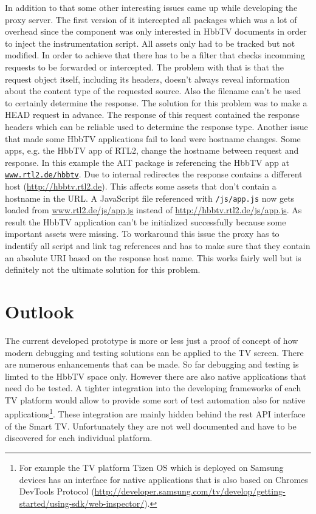 In addition to that some other interesting issues came up while developing the proxy server. The first version of it
intercepted all packages which was a lot of overhead since the component was only interested in HbbTV documents in
order to inject the instrumentation script. All assets only had to be tracked but not modified. In order to achieve
that there has to be a filter that checks incomming requests to be forwarded or intercepted. The problem with that is
that the request object itself, including its headers, doesn't always reveal information about the content type of the
requested source. Also the filename can't be used to certainly determine the response. The solution for this problem
was to make a HEAD request in advance. The response of this request contained the response headers which can be
reliable used to determine the response type. Another issue that made some HbbTV applications fail to load were
hostname changes. Some apps, e.g. the HbbTV app of RTL2, change the hostname between request and response. In this
example the AIT package is referencing the HbbTV app at \texttt{\url{www.rtl2.de/hbbtv}}. Due to internal redirectes
the response contains a different host (\url{http://hbbtv.rtl2.de}). This affects some assets that don't contain a
hostname in the URL. A JavaScript file referenced with \texttt{/js/app.js} now gets loaded from \url{www.rtl2.de/js/app.js}
instead of \url{http://hbbtv.rtl2.de/js/app.js}. As result the HbbTV application can't be initialized successfully
because some important assets were missing. To workaround this issue the proxy has to indentify all script and link tag
references and has to make sure that they contain an absolute URI based on the response host name. This works fairly
well but is definitely not the ultimate solution for this problem.

\section{Outlook\label{sec:outlook}}


The current developed prototype is more or less just a proof of concept of how modern debugging and testing solutions
can be applied to the TV screen. There are numerous enhancements that can be made. So far debugging and testing is
limted to the HbbTV space only. However there are also native applications that need do be tested. A tighter integration
into the developing frameworks of each TV platform would allow to provide some sort of test automation also for native
applications\footnote{For example the TV platform Tizen OS which is deployed on Samsung devices has an interface for
native applications that is also based on Chromes DevTools Protocol (\url{http://developer.samsung.com/tv/develop/getting-started/using-sdk/web-inspector/}).}.
These integration are mainly hidden behind the rest API interface of the Smart TV. Unfortunately they are not well
documented and have to be discovered for each individual platform.

